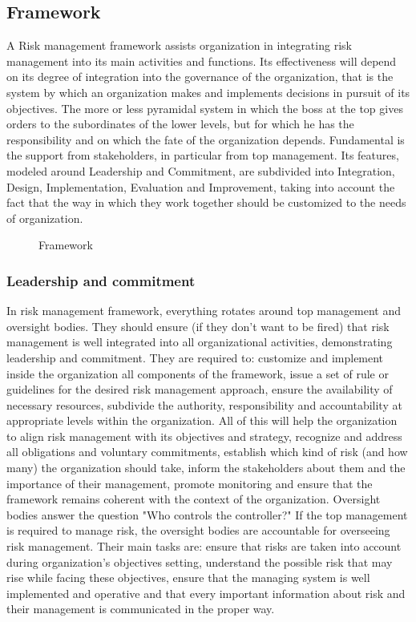 \subsection{Framework}
A Risk management framework assists organization in integrating risk management into its main activities and functions. Its effectiveness will depend on its degree of integration into the governance of the organization, that is the system by which an organization makes and implements decisions in pursuit of its objectives. The more or less pyramidal system in which the boss at the top gives orders to the subordinates of the lower levels, but for which he has the responsibility and on which the fate of the organization depends. Fundamental is the support from stakeholders, in particular from top management. Its features, modeled around Leadership and Commitment, are subdivided into Integration, Design, Implementation, Evaluation and Improvement, taking into account the fact that the way in which they work together should be customized to the needs of organization.
\begin{figure}[H]
  \centering
  
  \caption{Framework}
\end{figure}
\noindent
\subsubsection{Leadership and commitment}
In risk management framework, everything rotates around top management and oversight bodies. They should ensure (if they don't want to be fired) that risk management is well integrated into all organizational activities, demonstrating leadership and commitment. They are required to: customize and implement inside the organization all components of the framework, issue a set of rule or guidelines for the desired risk management approach, ensure the availability of necessary resources, subdivide the authority, responsibility and accountability at appropriate levels within the organization.
All of this will help the organization to align risk management with its objectives and strategy, recognize and address all obligations and voluntary commitments, establish which kind of risk (and how many) the organization should take, inform the stakeholders about them and the importance of their management, promote monitoring and ensure that the framework remains coherent with the context of the organization.\newline
Oversight bodies answer the question "Who controls the controller?" If the top management is required to manage risk, the oversight bodies are accountable for overseeing risk management. Their main tasks are: ensure that risks are taken into account during organization's objectives setting, understand the possible risk that may rise while facing these objectives, ensure that the managing system is well implemented and operative and that every important information about risk and their management is communicated in the proper way.
